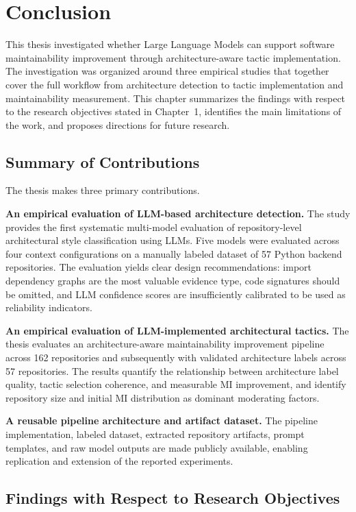 \chapter{Conclusion}
\label{chap:conclusion}

This thesis investigated whether Large Language Models can support software maintainability improvement through architecture-aware tactic implementation. The investigation was organized around three empirical studies that together cover the full workflow from architecture detection to tactic implementation and maintainability measurement. This chapter summarizes the findings with respect to the research objectives stated in Chapter~1, identifies the main limitations of the work, and proposes directions for future research.

\section{Summary of Contributions}

The thesis makes three primary contributions.

\textbf{An empirical evaluation of LLM-based architecture detection.} The study provides the first systematic multi-model evaluation of repository-level architectural style classification using LLMs. Five models were evaluated across four context configurations on a manually labeled dataset of 57 Python backend repositories. The evaluation yields clear design recommendations: import dependency graphs are the most valuable evidence type, code signatures should be omitted, and LLM confidence scores are insufficiently calibrated to be used as reliability indicators.

\textbf{An empirical evaluation of LLM-implemented architectural tactics.} The thesis evaluates an architecture-aware maintainability improvement pipeline across 162 repositories and subsequently with validated architecture labels across 57 repositories. The results quantify the relationship between architecture label quality, tactic selection coherence, and measurable MI improvement, and identify repository size and initial MI distribution as dominant moderating factors.

\textbf{A reusable pipeline architecture and artifact dataset.} The pipeline implementation, labeled dataset, extracted repository artifacts, prompt templates, and raw model outputs are made publicly available, enabling replication and extension of the reported experiments.

\section{Findings with Respect to Research Objectives}

